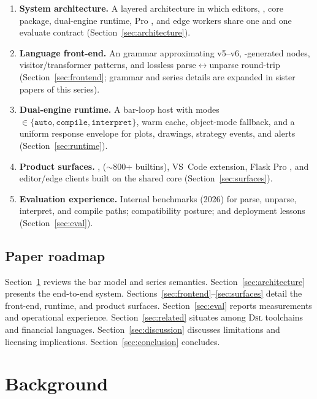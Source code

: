 \documentclass[11pt,a4paper]{article}
\begin{document}
\begin{enumerate}[leftmargin=1.4em]
  \item \textbf{System architecture.}
    A layered architecture in which editors, \lsp{}, core package, dual-engine
    runtime, Pro \api{}, and edge workers share one \ast{} and one evaluate
    contract (Section~\ref{sec:architecture}).
  \item \textbf{Language front-end.}
    An \antlr{} grammar approximating \pine{} v5--v6, \asdl{}-generated nodes,
    visitor/transformer patterns, and lossless parse$\leftrightarrow$unparse
    round-trip (Section~\ref{sec:frontend}; grammar and series details are
    expanded in sister papers of this series).
  \item \textbf{Dual-engine runtime.}
    A bar-loop host with modes
    $\in \{\texttt{auto},\texttt{compile},\texttt{interpret}\}$, warm \ir{}
    cache, object-mode fallback, and a uniform response envelope for plots,
    drawings, strategy events, and alerts (Section~\ref{sec:runtime}).
  \item \textbf{Product surfaces.}
    \cli{}, \lsp{} ($\sim$800+ builtins), VS~Code extension, Flask Pro \api{},
    and editor/edge clients built on the shared core (Section~\ref{sec:surfaces}).
  \item \textbf{Evaluation experience.}
    Internal benchmarks (2026) for parse, unparse, interpret, and compile paths;
    compatibility posture; and deployment lessons (Section~\ref{sec:eval}).
\end{enumerate}

\subsection{Paper roadmap}
\label{sec:roadmap}

Section~\ref{sec:background} reviews the \pine{} bar model and series
semantics.
Section~\ref{sec:architecture} presents the end-to-end system.
Sections~\ref{sec:frontend}--\ref{sec:surfaces} detail the front-end, runtime,
and product surfaces.
Section~\ref{sec:eval} reports measurements and operational experience.
Section~\ref{sec:related} situates \pyne{} among \textsc{Dsl} toolchains and
financial languages.
Section~\ref{sec:discussion} discusses limitations and licensing implications.
Section~\ref{sec:conclusion} concludes.

\section{Background}
\label{sec:background}
\end{document}
